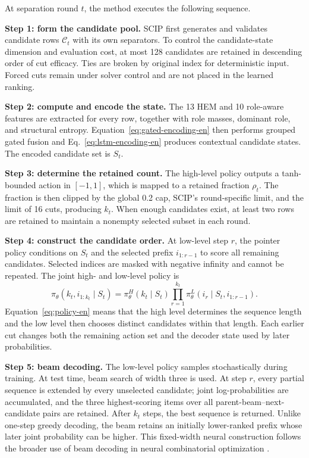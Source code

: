 \documentclass[journal]{IEEEtran}
\begin{document}
At separation round $t$, the method executes the following sequence.

\noindent\textbf{Step 1: form the candidate pool.} SCIP first generates and validates candidate rows $\mathcal C_t$ with its own separators. To control the candidate-state dimension and evaluation cost, at most 128 candidates are retained in descending order of cut efficacy. Ties are broken by original index for deterministic input. Forced cuts remain under solver control and are not placed in the learned ranking.

\noindent\textbf{Step 2: compute and encode the state.} The 13 HEM and 10 role-aware features are extracted for every row, together with role masses, dominant role, and structural entropy. Equation~\eqref{eq:gated-encoding-en} then performs grouped gated fusion and Eq.~\eqref{eq:lstm-encoding-en} produces contextual candidate states. The encoded candidate set is $S_t$.

\noindent\textbf{Step 3: determine the retained count.} The high-level policy outputs a tanh-bounded action in $[-1,1]$, which is mapped to a retained fraction $\rho_t$. The fraction is then clipped by the global 0.2 cap, SCIP's round-specific limit, and the limit of 16 cuts, producing $k_t$. When enough candidates exist, at least two rows are retained to maintain a nonempty selected subset in each round.

\noindent\textbf{Step 4: construct the candidate order.} At low-level step $r$, the pointer policy conditions on $S_t$ and the selected prefix $i_{1:r-1}$ to score all remaining candidates. Selected indices are masked with negative infinity and cannot be repeated. The joint high- and low-level policy is
\begin{equation}
\pi_\theta(k_t,i_{1:k_t}\mid S_t)=\pi_\theta^H(k_t\mid S_t)
\prod_{r=1}^{k_t}\pi_\theta^L(i_r\mid S_t,i_{1:r-1}).
\label{eq:policy-en}
\end{equation}
Equation~\eqref{eq:policy-en} means that the high level determines the sequence length and the low level then chooses distinct candidates within that length. Each earlier cut changes both the remaining action set and the decoder state used by later probabilities.

\noindent\textbf{Step 5: beam decoding.} The low-level policy samples stochastically during training. At test time, beam search of width three is used. At step $r$, every partial sequence is extended by every unselected candidate; joint log-probabilities are accumulated, and the three highest-scoring items over all parent-beam--next-candidate pairs are retained. After $k_t$ steps, the best sequence is returned. Unlike one-step greedy decoding, the beam retains an initially lower-ranked prefix whose later joint probability can be higher. This fixed-width neural construction follows the broader use of beam decoding in neural combinatorial optimization \cite{choo2022beam}.
\end{document}
